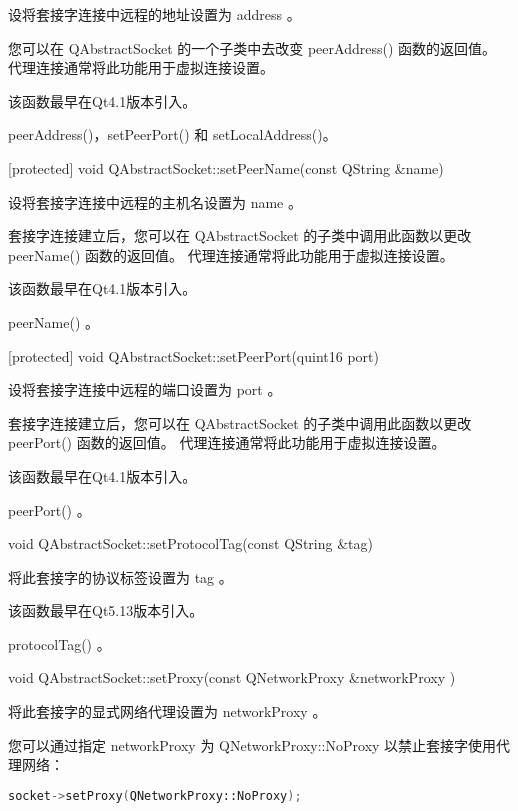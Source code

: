 设将套接字连接中远程的地址设置为 address 。

您可以在 QAbstractSocket 的一个子类中去改变 peerAddress() 函数的返回值。 代理连接通常将此功能用于虚拟连接设置。

该函数最早在Qt4.1版本引入。

\begin{seeAlso}
peerAddress()，setPeerPort() 和 setLocalAddress()。
\end{seeAlso}

[protected] void QAbstractSocket::setPeerName(const QString \&name)

设将套接字连接中远程的主机名设置为 name 。

套接字连接建立后，您可以在 QAbstractSocket 的子类中调用此函数以更改 peerName() 函数的返回值。 代理连接通常将此功能用于虚拟连接设置。

该函数最早在Qt4.1版本引入。


\begin{seeAlso}
 peerName() 。
\end{seeAlso}

[protected] void QAbstractSocket::setPeerPort(quint16 port)

设将套接字连接中远程的端口设置为 port 。

套接字连接建立后，您可以在 QAbstractSocket 的子类中调用此函数以更改 peerPort() 函数的返回值。 代理连接通常将此功能用于虚拟连接设置。

该函数最早在Qt4.1版本引入。


\begin{seeAlso}
peerPort() 。
\end{seeAlso}

void QAbstractSocket::setProtocolTag(const QString \&tag)

将此套接字的协议标签设置为 tag 。

该函数最早在Qt5.13版本引入。


\begin{seeAlso}
protocolTag() 。
\end{seeAlso}

void QAbstractSocket::setProxy(const QNetworkProxy \&networkProxy )

将此套接字的显式网络代理设置为 networkProxy 。

您可以通过指定 networkProxy 为 QNetworkProxy::NoProxy 以禁止套接字使用代理网络：


\begin{lstlisting}[language=C++]
socket->setProxy(QNetworkProxy::NoProxy);
\end{lstlisting} 


